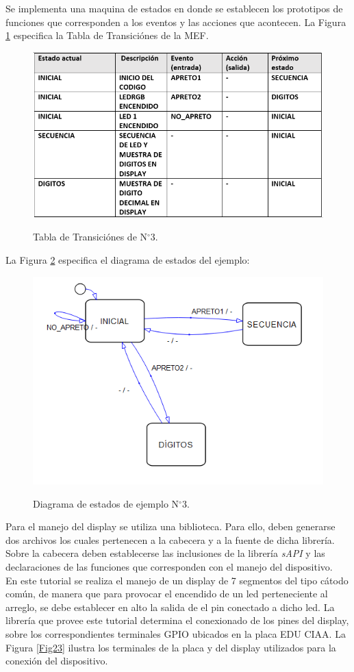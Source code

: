 \documentclass[12pt,letterpaper]{article}
\begin{document}
Se implementa una maquina de estados en donde se establecen los prototipos de funciones que corresponden a los eventos y las acciones que acontecen. 
La Figura \ref{tablatransicionej3} especifica la Tabla de Transiciónes de la MEF.
\begin{figure}[H]
\centering
\includegraphics[width=10 cm]{figuras/IMAGEN-EJEMPLO3.png}\\
\caption{Tabla de Transiciónes de N$^{\circ}$3.}
\label{tablatransicionej3}
\end{figure}

La Figura \ref{diagramaej3} especifica el diagrama de estados del ejemplo:

\begin{figure}[H]
\centering
\includegraphics[width=8 cm]{figuras/ejemplo-3.png}\\
\caption{Diagrama de estados de ejemplo N$^{\circ}$3.}
\label{diagramaej3}
\end{figure}
Para el manejo del display se utiliza una biblioteca. Para ello, deben generarse dos archivos los cuales pertenecen a la cabecera y a la fuente de dicha librería. Sobre la cabecera deben establecerse las inclusiones de la librería \textit{sAPI} y las declaraciones de las funciones que corresponden con el manejo del dispositivo.
 \\
 
En este tutorial se realiza el manejo de un display de 7 segmentos del tipo cátodo común, de manera que para provocar el encendido de un led perteneciente al arreglo, se debe establecer en alto la salida de el pin conectado a dicho led. La librería que provee este tutorial determina el conexionado de los pines del display, sobre los correspondientes terminales GPIO ubicados en la placa EDU CIAA. La Figura \ref{Fig23} ilustra los terminales de la placa y del display utilizados para la conexión del dispositivo.
\end{document}
